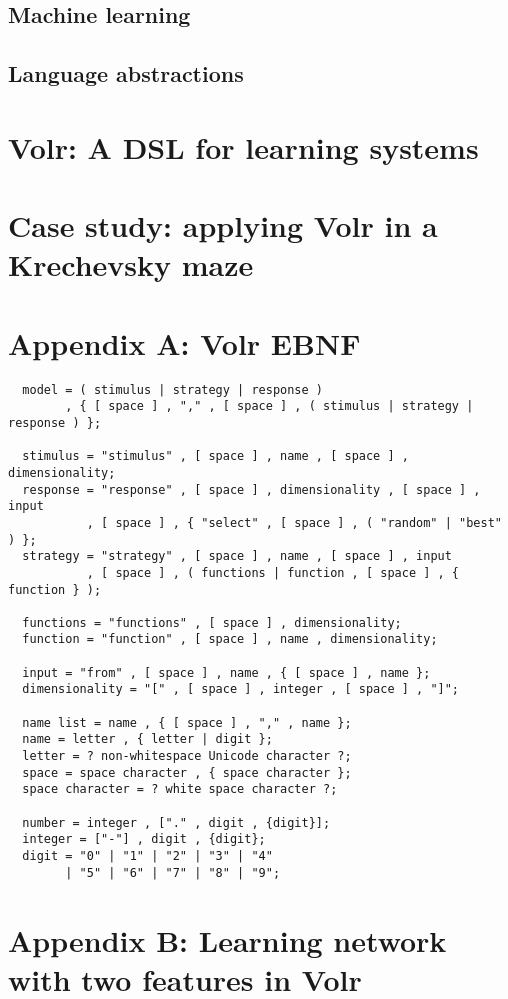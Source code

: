 \documentclass[a4paper,oneside]{memoir}
\begin{document}
\subsection{Machine learning}


\subsection{Language abstractions}

\section{Volr: A DSL for learning systems}
\label{volr}

\section{Case study: applying Volr in a Krechevsky maze}
\label{case}

\clearpage

\printglossary

\printbibliography

\section{Appendix A: Volr EBNF}
\label{ebnf}

\begin{verbatim}
  model = ( stimulus | strategy | response )
        , { [ space ] , "," , [ space ] , ( stimulus | strategy | response ) };

  stimulus = "stimulus" , [ space ] , name , [ space ] , dimensionality;
  response = "response" , [ space ] , dimensionality , [ space ] , input
           , [ space ] , { "select" , [ space ] , ( "random" | "best" ) };
  strategy = "strategy" , [ space ] , name , [ space ] , input
           , [ space ] , ( functions | function , [ space ] , { function } );

  functions = "functions" , [ space ] , dimensionality;
  function = "function" , [ space ] , name , dimensionality;

  input = "from" , [ space ] , name , { [ space ] , name };
  dimensionality = "[" , [ space ] , integer , [ space ] , "]";

  name list = name , { [ space ] , "," , name };
  name = letter , { letter | digit };
  letter = ? non-whitespace Unicode character ?;
  space = space character , { space character };
  space character = ? white space character ?;

  number = integer , ["." , digit , {digit}];
  integer = ["-"] , digit , {digit};
  digit = "0" | "1" | "2" | "3" | "4"
        | "5" | "6" | "7" | "8" | "9";
\end{verbatim}

\section{Appendix B: Learning network with two features in Volr}


\end{document}
